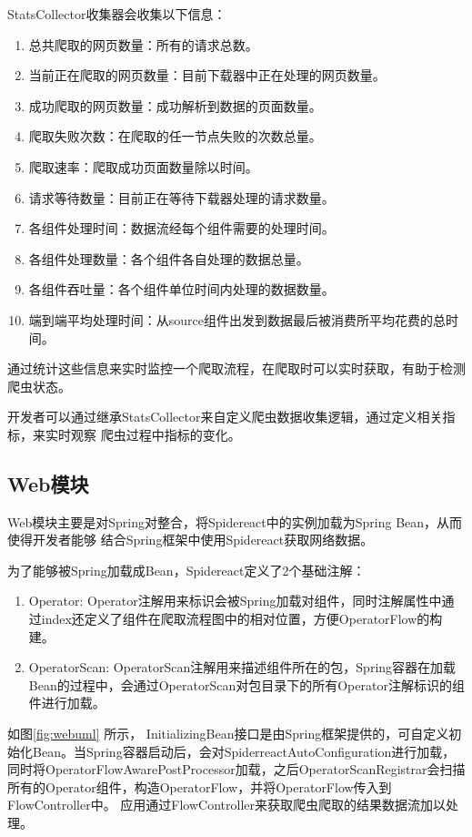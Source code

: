 \documentclass[master]{njuthesis}
\begin{document}
StatsCollector收集器会收集以下信息：
\begin{enumerate}
  \item 总共爬取的网页数量：所有的请求总数。
  \item 当前正在爬取的网页数量：目前下载器中正在处理的网页数量。
  \item 成功爬取的网页数量：成功解析到数据的页面数量。
  \item 爬取失败次数：在爬取的任一节点失败的次数总量。
  \item 爬取速率：爬取成功页面数量除以时间。
  \item 请求等待数量：目前正在等待下载器处理的请求数量。
  \item 各组件处理时间：数据流经每个组件需要的处理时间。
  \item 各组件处理数量：各个组件各自处理的数据总量。
  \item 各组件吞吐量：各个组件单位时间内处理的数据数量。
  \item 端到端平均处理时间：从source组件出发到数据最后被消费所平均花费的总时间。
\end{enumerate}

通过统计这些信息来实时监控一个爬取流程，在爬取时可以实时获取，有助于检测爬虫状态。

开发者可以通过继承StatsCollector来自定义爬虫数据收集逻辑，通过定义相关指标，来实时观察
爬虫过程中指标的变化。

\subsection{Web模块}
Web模块主要是对Spring对整合，将Spidereact中的实例加载为Spring Bean，从而使得开发者能够
结合Spring框架中使用Spidereact获取网络数据。


为了能够被Spring加载成Bean，Spidereact定义了2个基础注解：
\begin{enumerate}
  \item Operator: Operator注解用来标识会被Spring加载对组件，同时注解属性中通过index还定义了组件在爬取流程图中的相对位置，方便OperatorFlow的构建。
  \item OperatorScan: OperatorScan注解用来描述组件所在的包，Spring容器在加载Bean的过程中，会通过OperatorScan对包目录下的所有Operator注解标识的组件进行加载。
\end{enumerate}

如图\ref{fig:webuml} 所示， InitializingBean接口是由Spring框架提供的，可自定义初始化Bean。当Spring容器启动后，会对SpiderreactAutoConfiguration进行加载，
同时将OperatorFlowAwarePostProcessor加载，之后OperatorScanRegistrar会扫描所有的Operator组件，构造OperatorFlow，并将OperatorFlow传入到FlowController中。
应用通过FlowController来获取爬虫爬取的结果数据流加以处理。
\end{document}
